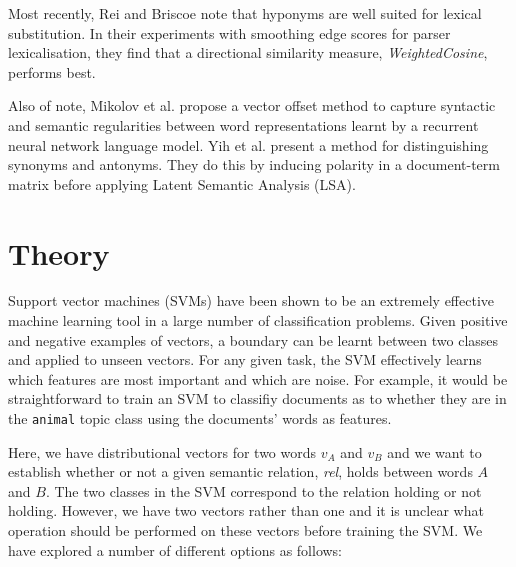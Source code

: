 \documentclass[11pt]{article}
\begin{document}
Most recently, Rei and Briscoe  note that hyponyms are well suited for lexical substitution.  In their experiments with smoothing edge scores for parser lexicalisation, they find that a directional similarity measure,  \emph{WeightedCosine}, performs best.

Also of note, Mikolov et al.  propose a vector offset method to capture syntactic and semantic regularities between word representations learnt by a recurrent neural network language model.  Yih et al.  present a method for distinguishing synonyms and antonyms.  They do this by inducing polarity in a document-term matrix before applying Latent Semantic Analysis (LSA).

\section{Theory}
\label{sect:theory}
Support vector machines (SVMs) have been shown to be an extremely effective machine learning tool in a large number of classification problems.  Given positive and negative examples of vectors, a boundary can be learnt between two classes and applied to unseen vectors.  For any given task, the SVM effectively learns which features are most important and which are noise.  For example, it would be straightforward to train an SVM to classifiy documents as to whether they are in the \texttt{animal} topic class using the documents' words as features.     

Here, we have distributional vectors for two words $v_A$ and $v_B$ and we want to establish whether or not a given semantic relation, \emph{rel}, holds between words $A$ and $B$. The two classes in the SVM correspond to the relation holding or not holding.  However, we have two vectors rather than one and it is unclear what operation should be performed on these vectors before training the SVM.  We have explored a number of different options as follows:
\end{document}
